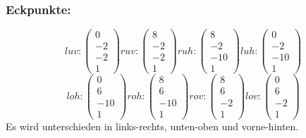 \documentclass{article}
\begin{document}
\subsubsection*{Eckpunkte:}
\[
    luv:
    \begin{pmatrix}
            0 \\
            -2 \\
            -2 \\
            1
    \end{pmatrix}
    ruv:
    \begin{pmatrix}
            8 \\
            -2 \\
            -2 \\
            1
    \end{pmatrix}
    ruh:
    \begin{pmatrix}
            8 \\
            -2 \\
            -10 \\
            1
    \end{pmatrix}
    luh:
    \begin{pmatrix}
            0 \\
            -2 \\
            -10 \\
            1
    \end{pmatrix}
    \]\[
    loh:
    \begin{pmatrix}
            0 \\
            6 \\
            -10 \\
            1
    \end{pmatrix}
    roh:
    \begin{pmatrix}
            8 \\
            6 \\
            -10 \\
            1
    \end{pmatrix}
    rov:
    \begin{pmatrix}
            8 \\
            6 \\
            -2 \\
            1
    \end{pmatrix}
    lov:
    \begin{pmatrix}
            0 \\
            6 \\
            -2 \\
            1
    \end{pmatrix}
\]
Es wird unterschieden in links-rechts, unten-oben und vorne-hinten.
\end{document}
